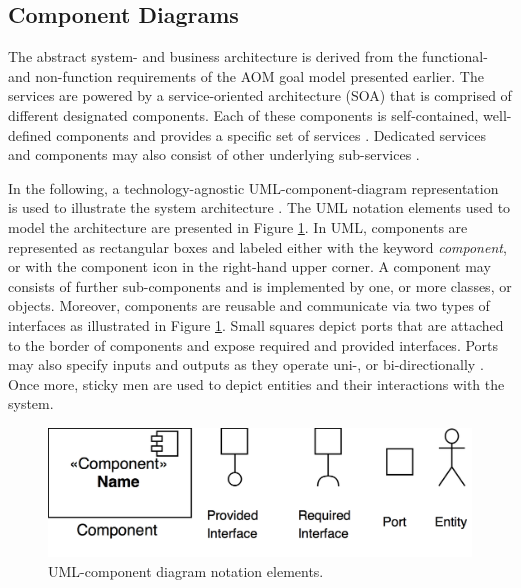 \documentclass{llncs}
\begin{document}
{			%

		
		\subsection{Component Diagrams}
			\label{ss:component-diagrams}

			The abstract system- and business architecture is derived from the functional- and non-function requirements of the AOM goal model presented earlier. The services are powered by a service-oriented architecture (SOA) that is comprised of different designated components. Each of these components is self-contained, well-defined components and provides a specific set of services \cite{erl2005service}\cite{perrey2003service}. Dedicated services and components may also consist of other underlying sub-services \cite{rosen2012applied}. 
			
			In the following, a technology-agnostic UML-component-diagram representation is used to illustrate the system architecture \cite{booch1996unified}\cite{specification2007omg}. The UML notation elements used to model the architecture are presented in Figure \ref{fig:uml-component-diagram-overview}. In UML, components are represented as rectangular boxes and labeled either with the keyword \textit{component}, or with the component icon in the right-hand upper corner. A component may consists of further sub-components and is implemented by one, or more classes, or objects. Moreover, components are reusable and communicate via two types of interfaces as illustrated in Figure \ref{fig:uml-component-diagram-overview}. Small squares depict ports that are attached to the border of components and expose required and provided interfaces. Ports may also specify inputs and outputs as they operate uni-, or bi-directionally \cite{booch1996unified}\cite{specification2007omg}. Once more, sticky men are used to depict entities and their interactions with the system. 
			
			\begin{figure}[H]
				\centering
				\includegraphics[scale=0.15]{Figures/UML-notation-elements.png}
				\caption{UML-component diagram notation elements.}	
				\label{fig:uml-component-diagram-overview}
			\end{figure}	
			
}
\end{document}
